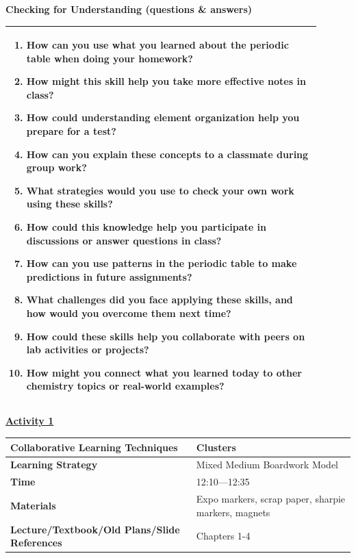 \documentclass{article}
\begin{document}
\begin{flushleft}
\newpage
\noindent
{\large \textbf{Checking for Understanding (questions \& answers)}} \\
\begin{tabular}{|p{0.9\linewidth}|}
\hline
\begin{enumerate}
    \item How can you use what you learned about the periodic table when doing your homework?
    \item How might this skill help you take more effective notes in class?
    \item How could understanding element organization help you prepare for a test?
    \item How can you explain these concepts to a classmate during group work?
    \item What strategies would you use to check your own work using these skills?
    \item How could this knowledge help you participate in discussions or answer questions in class?
    \item How can you use patterns in the periodic table to make predictions in future assignments?
    \item What challenges did you face applying these skills, and how would you overcome them next time?
    \item How could these skills help you collaborate with peers on lab activities or projects?
    \item How might you connect what you learned today to other chemistry topics or real-world examples?
\end{enumerate} \\
\hline
\end{tabular}








\newpage
\noindent
\textbf{\underline{Activity 1}} \\
\begin{tabular}{|p{4.2cm}|p{9.8cm}|}
\hline
\textbf{Collaborative Learning Techniques} & Clusters \\
\hline
\textbf{Learning Strategy} & Mixed Medium Boardwork Model \\
\hline
\textbf{Time} & 12:10---12:35 \\
\hline
\textbf{Materials} & Expo markers, scrap paper, sharpie markers, magnets \\
\hline
\textbf{Lecture/Textbook/Old Plans/Slide References} & Chapters 1-4\\
\hline
\end{tabular}


\end{flushleft}
\end{document}
